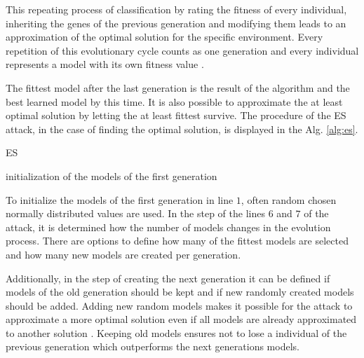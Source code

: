 This repeating process of classification by rating the fitness of every individual, inheriting the genes of the previous generation and modifying them leads to an approximation of the optimal solution for the specific environment.
Every repetition of this evolutionary cycle counts as one generation and every individual represents a model with its own fitness value	\cite{Becker2015ThePUFs}. %

The fittest model after the last generation is the result of the algorithm and the best learned model by this time.
It is also possible to approximate the at least optimal solution by letting the at least fittest survive. %
The procedure of the \ac{ES} attack, in the case of finding the optimal solution, is displayed in the Alg. \ref{alg:es}.

\SetAlCapHSkip{0.2em}
\begin{algorithm}[H] %
\Indm
\SetAlgoLined
\caption{\acl{ES}}
\label{alg:es}
\Indp

initialization of the models of the first generation\\
\end{algorithm}

To initialize the models of the first generation in line $1$, often random chosen normally distributed values are used.
In the step of the lines $6$ and $7$ of the attack, it is determined how the number of models changes in the evolution process. %
There are options to define how many of the fittest models are selected and how many new models are created per generation.

Additionally, in the step of creating the next generation it can be defined if models of the old generation should be kept and if new randomly created models should be added. %
Adding new random models makes it possible for the attack to approximate a more optimal solution even if all models are already approximated to another solution \cite{Wikipedia2016EvolutionStrategy}.
Keeping old models ensures not to lose a individual of the previous generation which outperforms the next generations models.

